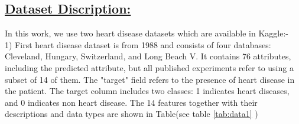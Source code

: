 \documentclass[11pt]{article}
\begin{document}
\subsection{\underline{Dataset Discription:}}
In this work, we use two heart disease datasets which are available in Kaggle:-\\
1) First heart disease dataset is from 1988 and consists of four databases: Cleveland, Hungary, Switzerland, and Long Beach V. It contains 76 attributes, including the predicted attribute, but all published experiments refer to using a subset of 14 of them. The "target" field refers to the presence of heart disease in the patient. The target
column includes two classes: 1 indicates heart diseases, and 0
indicates non heart disease. The 14 features together with their descriptions and data types are shown 
in Table(see table \ref{tab:data1} )\\
\end{document}
